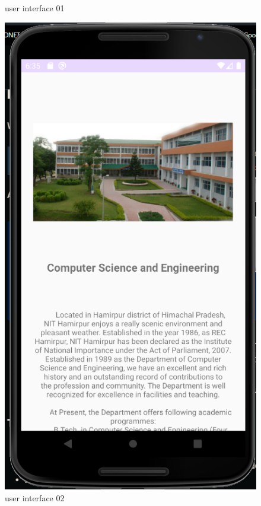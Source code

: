 \documentclass[11pt,a4paper]{report}
\begin{document}
\begin{figure}[H]
\begin{minipage}[b]{0.4\textwidth}
    \caption{user interface 01}
  \end{minipage}
  \hfill
  \begin{minipage}[b]{0.4\textwidth}
    \includegraphics[width=\textwidth]{./img/Capture2.png}
    \caption{user interface 02}
  \end{minipage}
\end{figure}
\end{document}
